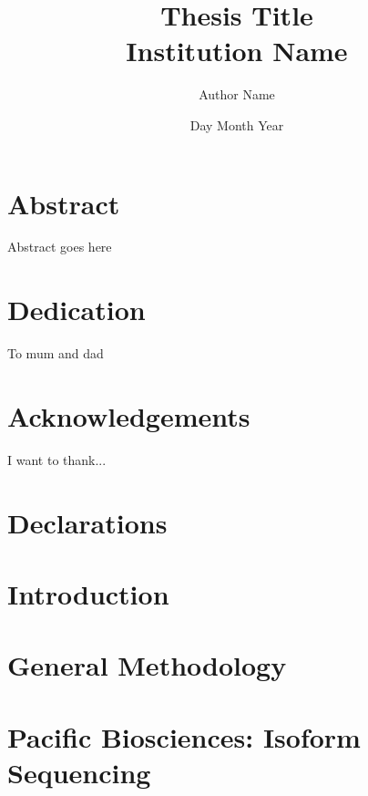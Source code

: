 \documentclass[a4paper,12pt,oneside]{report}
\begin{document}
\title{
	{Thesis Title}\\
	{\large Institution Name}\\}
\author{Author Name}
\date{Day Month Year}

\normallinespacing
\maketitle

\chapter*{Abstract}
Abstract goes here

\chapter*{Dedication}
To mum and dad

\chapter*{Acknowledgements}
I want to thank...

\chapter*{Declarations}



\newpage
\tableofcontents

\newpage
\listoffigures

\newpage
\listoftables

\newpage
\renewcommand{\nomname}{Abbreviations}
\printnomenclature 

\chapter{Introduction}


\chapter{General Methodology}


\chapter{Pacific Biosciences: Isoform Sequencing}
%
%
%
%
\end{document}
